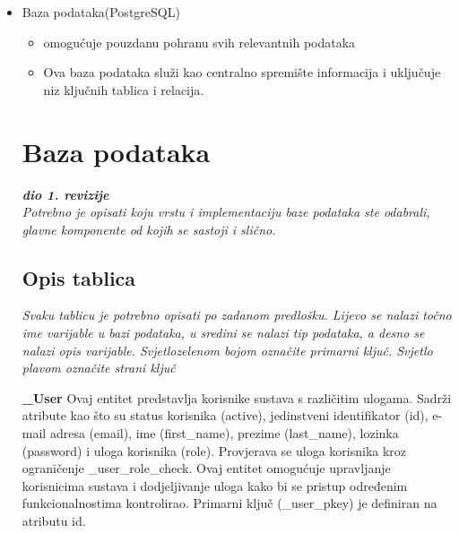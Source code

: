 \begin{itemize}
    \item Baza podataka(PostgreSQL)
\begin{itemize}
    \item omogućuje pouzdanu  pohranu svih relevantnih podataka
    \item  Ova baza podataka služi kao centralno spremište informacija i uključuje niz ključnih tablica i relacija.  
    
\end{itemize}
 

		

				
		\section{Baza podataka}
			
			\textbf{\textit{dio 1. revizije}}\\
			
		\textit{Potrebno je opisati koju vrstu i implementaciju baze podataka ste odabrali, glavne komponente od kojih se sastoji i slično.}
		
			\subsection{Opis tablica}
			

				\textit{Svaku tablicu je potrebno opisati po zadanom predlošku. Lijevo se nalazi točno ime varijable u bazi podataka, u sredini se nalazi tip podataka, a desno se nalazi opis varijable. Svjetlozelenom bojom označite primarni ključ. Svjetlo plavom označite strani ključ}
				
\textbf{\_User } Ovaj entitet predstavlja korisnike sustava s različitim ulogama.  Sadrži atribute kao što su status korisnika (active), jedinstveni identifikator (id), e-mail adresa (email), ime (first\_name), prezime (last\_name), lozinka (password) i uloga korisnika (role). Provjerava se uloga korisnika kroz ograničenje \_user\_role\_check. Ovaj entitet omogućuje upravljanje korisnicima sustava i dodjeljivanje uloga kako bi se pristup određenim funkcionalnostima kontrolirao.  Primarni ključ (\_user\_pkey) je definiran na atributu id. 


\end{itemize}
